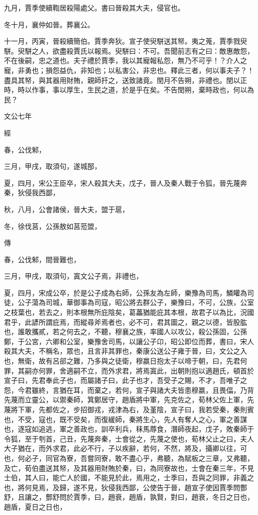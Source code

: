 \documentclass{ctexart}
\begin{document}
九月，賈季使續鞫居殺陽處父。書曰晉殺其大夫，侵官也。

冬十月，襄仲如晉。葬襄公。

十一月，丙寅，晉殺續簡伯。賈季奔狄。宣子使臾駢送其帑。夷之蒐，賈季戮臾駢。臾駢之人，欲盡殺賈氏以報焉。臾駢曰：不可。吾聞前志有之曰：敵惠敵怨，不在後嗣，忠之道也。夫子禮於賈季，我以其寵報私怨，無乃不可乎！？介人之寵，非勇也；損怨益仇，非知也；以私害公，非忠也。釋此三者，何以事夫子？！盡具其帑，與其器用財賄，親師扞之，送致諸竟。閏月不告朔，非禮也。閏以正時，時以作事，事以厚生，生民之道，於是乎在矣。不告閏朔，棄時政也，何以為民？





文公七年


經



春，公伐邾，

三月，甲戌，取須句，遂城郚，

夏，四月，宋公王臣卒，宋人殺其大夫，戊子，晉人及秦人戰于令狐，晉先蔑奔秦，狄侵我西鄙，

秋，八月，公會諸侯，晉大夫，盟于扈，

冬，徐伐莒，公孫敖如莒蒞盟，

傳



春，公伐邾，間晉難也，

三月，甲戌，取須句，寘文公子焉，非禮也，

夏，四月，宋成公卒，於是公子成為右師，公孫友為左師，樂豫為司馬，鱗矔為司徒，公子蕩為司城，華御事為司寇，昭公將去群公子，樂豫曰，不可，公族，公室之枝葉也，若去之，則本根無所庇陰矣，葛藟猶能庇其本根，故君子以為比，況國君乎，此諺所謂庇焉，而縱尋斧焉者也，必不可，君其圖之，親之以德，皆股肱也，誰敢攜貳，若之何去之，不聽，穆襄之族，率國人以攻公，殺公孫固，公孫鄭，于公宮，六卿和公室，樂豫舍司馬，以讓公子卬，昭公即位而葬，書曰，宋人殺其大夫，不稱名，眾也，且言非其罪也，秦康公送公子雍于晉，曰，文公之入也，無衛，故有呂郤之難，乃多與之徒衛，穆嬴日抱太子以啼于朝，曰，先君何罪，其嗣亦何罪，舍適嗣不立，而外求君，將焉寘此，出朝則抱以適趙氏，頓首於宣子曰，先君奉此子也，而屬諸子曰，此子也才，吾受子之賜，不才，吾唯子之怨，今君雖終，言猶在耳，而棄之，若何，宣子與諸大夫皆患穆嬴，且畏偪，乃背先蔑而立靈公，以禦秦師，箕鄭居守，趙盾將中軍，先克佐之，荀林父佐上軍，先蔑將下軍，先都佐之，步招御戎，戎津為右，及堇陰，宣子曰，我若受秦，秦則賓也，不受，寇也，既不受矣，而復緩師，秦將生心，先人有奪人之心，軍之善謀也，逐寇如追逃，軍之善政也，訓卒利兵，秣馬蓐食，潛師夜起，戊子，敗秦師于令狐，至于刳首，己丑，先蔑奔秦，士會從之，先蔑之使也，荀林父止之曰，夫人大子猶在，而外求君，此必不行，子以疾辭，若何，不然，將及，攝卿以往，可也，何必子，同官為寮，吾嘗同寮，敢不盡心乎，弗聽，為賦板之三章，又弗聽，及亡，荀伯盡送其帑，及其器用財賄於秦，曰，為同寮故也，士會在秦三年，不見士伯，其人曰，能亡人於國，不能見於此，焉用之，士季曰，吾與之同罪，非義之也，將何見焉，及歸，遂不見，狄侵我西鄙，公使告于晉，趙宣子使因賈季問酆舒，且讓之，酆舒問於賈季，曰，趙衰，趙盾，孰賢，對曰，趙衰，冬日之日也，趙盾，夏日之日也，
\end{document}

